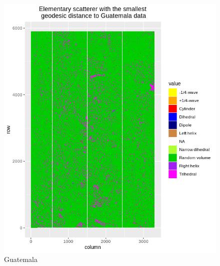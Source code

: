 \documentclass[12pt]{article}
\begin{document}
\begin{figure}[!h]
    \centering    
    \includegraphics[width = 0.8\linewidth]{../../Images/Report_18_12_20/Classifier_Geo_Dist/Class_Map/Guate/geo_dist_guatemala.png}
    \caption{Guatemala}
    \label{fig:class_map_guate}
\end{figure}



\end{document}
